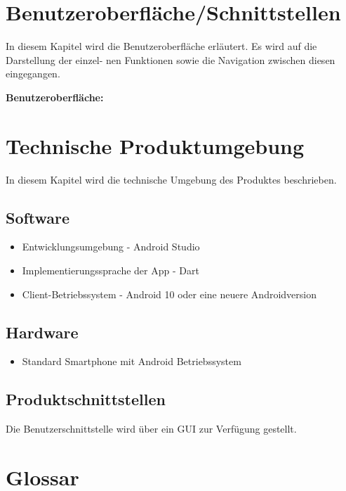 \documentclass[parskip=full]{scrartcl}
\begin{document}
\section{Benutzeroberfläche/Schnittstellen}
In diesem Kapitel wird die Benutzeroberfläche erläutert. Es wird auf die Darstellung der einzel- nen Funktionen sowie die Navigation zwischen diesen eingegangen.

\textbf{Benutzeroberfläche:}

\section{Technische Produktumgebung}
In diesem Kapitel wird die technische Umgebung des Produktes beschrieben.

\subsection{Software}
\begin{itemize}
    \item Entwicklungsumgebung - Android Studio
    \item Implementierungssprache der App - Dart
    \item Client-Betriebssystem - Android 10 oder eine neuere Androidversion
\end{itemize}

\subsection{Hardware}
\begin{itemize}
    \item Standard Smartphone mit Android Betriebssystem
\end{itemize}

\subsection{Produktschnittstellen}
Die Benutzerschnittstelle wird über ein GUI zur Verfügung gestellt.

\section{Glossar}
\end{document}
